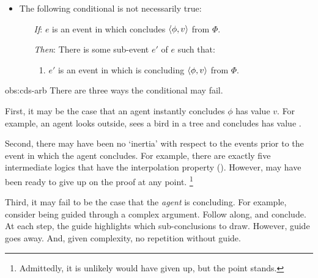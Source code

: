 \begin{note}
\begin{observation}
    \begin{itemize}
    \item
      The following conditional is not necessarily true:
      \begin{itemize}
      \item[\emph{If}:]
        \(e\) is an event in which \vAgent{} concludes \(\langle \phi, v \rangle\) from \(\Phi\).
      \item[\emph{Then}:]
        There is some sub-event \(e'\) of \(e\) such that:
        \begin{enumerate}
        \item
          \(e'\) is an event in which \vAgent{} is concluding \(\langle \phi, v \rangle\) from \(\Phi\).
        \end{enumerate}
      \end{itemize}
    \end{itemize}
  \end{observation}

  \begin{argument}{obs:cds-arb}
    There are three ways the conditional may fail.

    First, it may be the case that an agent instantly concludes \(\phi\) has value \(v\).
    For example, an agent looks outside, sees a bird in a tree and concludes  has value .

    Second, there may have been no `inertia' with respect to the events prior to the event in which the agent concludes.
    For example, there are exactly five intermediate logics that have the interpolation property (\cite[cf.][]{Maksimova:1977un}).
    However, \citeauthor{Maksimova:1977un} may have been ready to give up on the proof at any point.%
    \footnote{%
      Admittedly, it is unlikely \citeauthor{Maksimova:1977un} would have given up, but the point stands.
    }

    Third, it may fail to be the case that the \emph{agent} is concluding.
    For example, consider being guided through a complex argument.
    Follow along, and conclude.
    At each step, the guide highlights which sub-conclusions to draw.
    However, guide goes away.
    And, given complexity, no repetition without guide.
  \end{argument}
\end{note}

